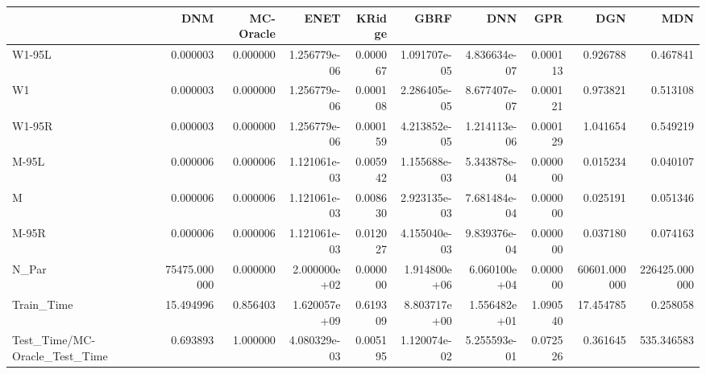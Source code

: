 \begin{tabular}{lrrrrrrrrr}
\toprule
{} &           DNM &  MC-Oracle &          ENET &    KRidge &          GBRF &           DNN &       GPR &           DGN &            MDN \\
\midrule
W1-95L                        &      0.000003 &   0.000000 &  1.256779e-06 &  0.000067 &  1.091707e-05 &  4.836634e-07 &  0.000113 &      0.926788 &       0.467841 \\
W1                            &      0.000003 &   0.000000 &  1.256779e-06 &  0.000108 &  2.286405e-05 &  8.677407e-07 &  0.000121 &      0.973821 &       0.513108 \\
W1-95R                        &      0.000003 &   0.000000 &  1.256779e-06 &  0.000159 &  4.213852e-05 &  1.214113e-06 &  0.000129 &      1.041654 &       0.549219 \\
M-95L                         &      0.000006 &   0.000006 &  1.121061e-03 &  0.005942 &  1.155688e-03 &  5.343878e-04 &  0.000000 &      0.015234 &       0.040107 \\
M                             &      0.000006 &   0.000006 &  1.121061e-03 &  0.008630 &  2.923135e-03 &  7.681484e-04 &  0.000000 &      0.025191 &       0.051346 \\
M-95R                         &      0.000006 &   0.000006 &  1.121061e-03 &  0.012027 &  4.155040e-03 &  9.839376e-04 &  0.000000 &      0.037180 &       0.074163 \\
N\_Par                         &  75475.000000 &   0.000000 &  2.000000e+02 &  0.000000 &  1.914800e+06 &  6.060100e+04 &  0.000000 &  60601.000000 &  226425.000000 \\
Train\_Time                    &     15.494996 &   0.856403 &  1.620057e+09 &  0.619309 &  8.803717e+00 &  1.556482e+01 &  1.090540 &     17.454785 &       0.258058 \\
Test\_Time/MC-Oracle\_Test\_Time &      0.693893 &   1.000000 &  4.080329e-03 &  0.005195 &  1.120074e-02 &  5.255593e-01 &  0.072526 &      0.361645 &     535.346583 \\
\bottomrule
\end{tabular}
